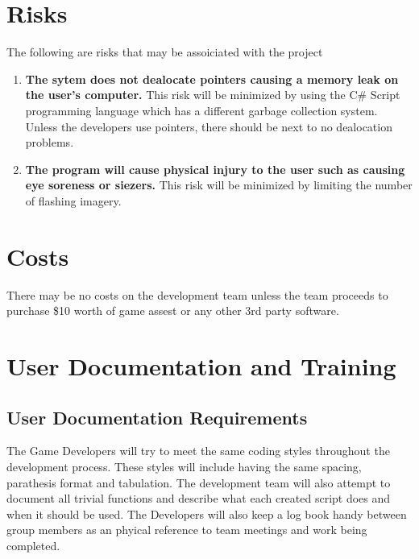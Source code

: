 \documentclass{article}
\begin{document}
\section{Risks}
\quad The following are risks that may be assoiciated with the project
\begin{enumerate}[{R}1. ]
	\item \textbf{The sytem does not dealocate pointers causing a memory leak on the user's computer.} This risk will be minimized by using the C\# Script programming language which has a different garbage collection system. Unless the developers use pointers, there should be next to no dealocation problems.
	\item \textbf{The program will cause physical injury to the user such as causing eye soreness or siezers.} This risk will be minimized by limiting the number of flashing imagery.
\end{enumerate}
\section{Costs}
\quad There may be no costs on the development team unless the team proceeds to purchase \$10 worth of game assest or any other 3rd party software.
\section{User Documentation and Training}
\subsection{User Documentation Requirements}
\quad The Game Developers will try to meet the same coding styles throughout the development process. These styles will include having the same spacing, parathesis format and tabulation. The development team will also attempt to document all trivial functions and describe what each created script does and when it should be used. The Developers will also keep a log book handy between group members as an phyical reference to team meetings and work being completed.
\end{document}
